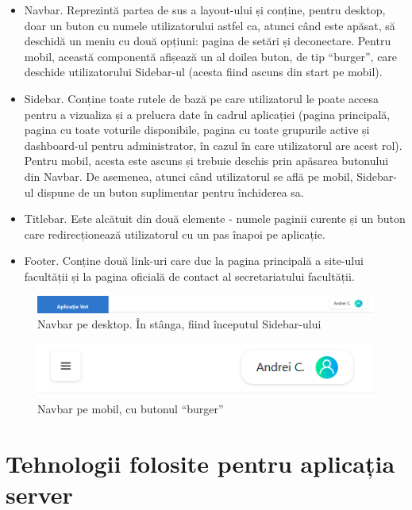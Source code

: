 \begin{itemize}
    \item Navbar. Reprezintă partea de sus a layout-ului și conține, pentru desktop, doar un buton cu numele utilizatorului astfel ca, atunci când este apăsat, să deschidă un meniu cu două opțiuni: pagina de setări și deconectare. Pentru mobil, această componentă afișează un al doilea buton, de tip \enquote{burger}, care deschide utilizatorului Sidebar-ul (acesta fiind ascuns din start pe mobil).
    \item Sidebar. Conține toate rutele de bază pe care utilizatorul le poate accesa pentru a vizualiza și a prelucra date în cadrul aplicației (pagina principală, pagina cu toate voturile disponibile, pagina cu toate grupurile active și dashboard-ul pentru administrator, în cazul în care utilizatorul are acest rol). Pentru mobil, acesta este ascuns și trebuie deschis prin apăsarea butonului din Navbar. De asemenea, atunci când utilizatorul se află pe mobil, Sidebar-ul dispune de un buton suplimentar pentru închiderea sa.
    \item Titlebar. Este alcătuit din două elemente - numele paginii curente și un buton care redirecționează utilizatorul cu un pas înapoi pe aplicație.
    \item Footer. Conține două link-uri care duc la pagina principală a site-ului facultății și la pagina oficială de contact al secretariatului facultății.
\end{itemize}

\hfill

\begin{figure}[!h]
    \centering
    \includegraphics[width=135mm]{images/navbar_desktop.png}
    \caption{Navbar pe desktop. În stânga, fiind începutul Sidebar-ului}
\end{figure}

\begin{figure}[!h]
    \centering
    \includegraphics[width=115mm]{images/navbar_mobil.png}
    \caption{Navbar pe mobil, cu butonul \enquote{burger}}
\end{figure}


\section{Tehnologii folosite pentru aplicația server}


